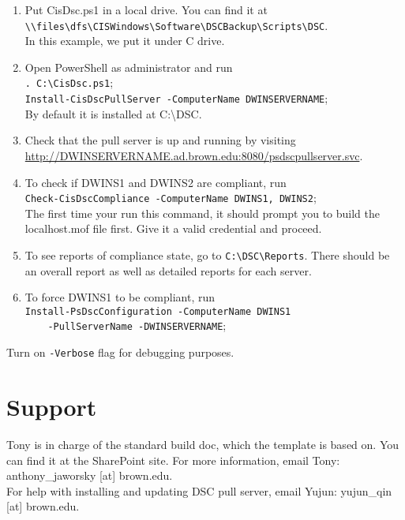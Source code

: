     \begin{enumerate}[label=\arabic*.]
      \item Put CisDsc.ps1 in a local drive. You can find it at\\
      \verb^\\files\dfs\CISWindows\Software\DSCBackup\Scripts\DSC^.\\
      In this example, we put it under C drive.
      \item Open PowerShell as administrator and run\\
      \verb^. C:\CisDsc.ps1^;\\
      \verb^Install-CisDscPullServer -ComputerName DWINSERVERNAME^;\\
      By default it is installed at C:\textbackslash DSC.
      \item Check that the pull server is up and running by visiting \url{http://DWINSERVERNAME.ad.brown.edu:8080/psdscpullserver.svc}.
      \item To check if DWINS1 and DWINS2 are compliant, run\\
      \verb^Check-CisDscCompliance -ComputerName DWINS1, DWINS2^;\\
      The first time your run this command, it should prompt you to build the localhost.mof file first. Give it a valid credential and proceed.
      \item To see reports of compliance state, go to \verb^C:\DSC\Reports^. There should be an overall report as well as detailed reports for each server.
      \item To force DWINS1 to be compliant, run\\
      \verb^Install-PsDscConfiguration -ComputerName DWINS1^\\
      \verb^    -PullServerName -DWINSERVERNAME^;
    \end{enumerate}
    Turn on \verb|-Verbose| flag for debugging purposes.

  \section{Support}
    Tony is in charge of the standard build doc, which the template is based on. You can find it at the SharePoint site. For more information, email Tony: anthony\_jaworsky [at] brown.edu.\\
    For help with installing and updating DSC pull server, email Yujun: yujun\_qin [at] brown.edu. 

